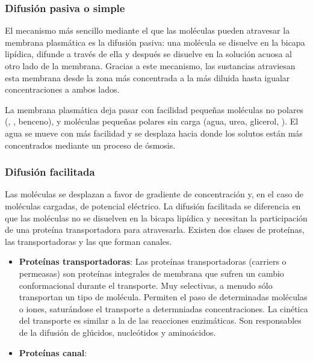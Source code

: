 \subsubsection{Difusión pasiva o simple}
El mecanismo más sencillo mediante el que las moléculas pueden atravesar la membrana plasmática es la difusión pasiva: una molécula se disuelve en la bicapa lipídica, difunde a través de ella y después se disuelve en la solución acuosa al otro lado de la membrana. Gracias a este mecanismo, las sustancias atraviesan esta membrana desde la zona más concentrada a la más diluida hasta igualar concentraciones a ambos lados.

La membrana plasmática deja pasar con facilidad pequeñas moléculas no polares (, , benceno), y moléculas pequeñas polares sin carga (agua, urea, glicerol, ). El agua se mueve con más facilidad y se desplaza hacia donde los solutos están más concentrados mediante un proceso de ósmosis.
\subsubsection{Difusión facilitada}
Las moléculas se desplazan a favor de gradiente de concentración y, en el caso de moléculas cargadas, de potencial eléctrico. La difusión facilitada se diferencia en que las moléculas no se disuelven en la bicapa lipídica y necesitan la participación de una proteína transportadora para atravesarla. Existen dos clases de proteínas, las transportadoras y las que forman canales.
\begin{itemize}[itemsep=0pt,parsep=0pt,topsep=0pt,partopsep=0pt]
    \item \textbf{Proteínas transportadoras}: Las proteínas transportadoras (carriers o permeasas) son proteínas integrales de membrana que sufren un cambio conformacional durante el transporte. Muy selectivas, a menudo sólo transportan un tipo de molécula. Permiten el paso de determinadas moléculas o iones, saturándose el transporte a determniadas concentraciones. La cinética del transporte es similar a la de las reacciones enzimáticas. Son responsables de la difusión de glúcidos, nucleótidos y aminoácidos.
    \item\textbf{Proteínas canal}:
\end{itemize}
